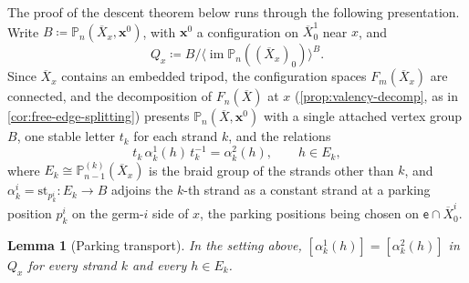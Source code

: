 \documentclass[reqno]{amsart}
\newtheorem{lemma}[theorem]{Lemma}
\theoremstyle{definition}
\newcommand\bfx{\mathbf{x}}
\newcommand\sfe{\mathsf{e}}
\newcommand{\PB}{\mathbb{P}}
\newcommand{\im}{\operatorname{im}}
\newcommand{\co}[1]{\mathopen{\langle}#1\mathclose{\rangle}} %
\newcommand{\base}{\bfx^0}
\renewcommand{\bar}{\overline}
\numberwithin{equation}{section}
\begin{document}
The proof of the descent theorem below runs through the
following presentation. Write \(B\coloneqq\PB_n(\bar X_x,\base)\), with \(\base\) a
configuration on \(\bar X_0^1\) near \(x\), and
\[
Q_x\coloneqq B\big/\co{\im\PB_n((\bar X_x)_0)}^{B}.
\]
Since \(\bar X_x\) contains an embedded tripod, the
configuration spaces \(F_m(\bar X_x)\) are connected, and the
decomposition of \(F_n(\bar X)\) at \(x\)
(\cref{prop:valency-decomp}, as in
\cref{cor:free-edge-splitting}) presents \(\PB_n(\bar X,\base)\)
with a single attached vertex group \(B\), one stable letter
\(t_k\) for each strand \(k\), and the relations
\[
t_k\,\alpha^1_k(h)\,t_k^{-1}=\alpha^2_k(h),
\qquad h\in E_k ,
\]
where \(E_k\cong\PB^{(k)}_{n-1}(\bar X_x)\) is the braid group
of the strands other than \(k\), and
\(\alpha^i_k=\mathrm{st}_{p^i_k}\colon E_k\to B\) adjoins the
\(k\)-th strand as a constant strand at a parking position
\(p^i_k\) on the germ-\(i\) side of \(x\), the parking
positions being chosen on \(\sfe\cap\bar X_0^i\).

\begin{lemma}[Parking transport]\label{lem:parking-transport}
In the setting above,
\([\alpha^1_k(h)]=[\alpha^2_k(h)]\) in \(Q_x\) for every strand
\(k\) and every \(h\in E_k\).
\end{lemma}
\end{document}

